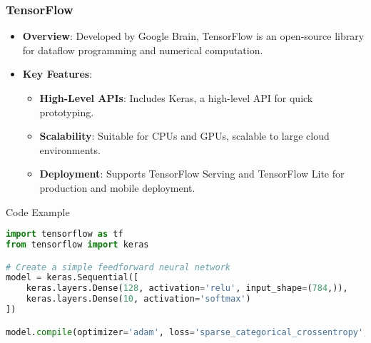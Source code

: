 \documentclass[aspectratio=169]{beamer}
\begin{document}
\begin{frame}[fragile]
    \frametitle{TensorFlow}
    \begin{itemize}
        \item \textbf{Overview}: Developed by Google Brain, TensorFlow is an open-source library for dataflow programming and numerical computation.
        \item \textbf{Key Features}:
            \begin{itemize}
                \item \textbf{High-Level APIs}: Includes Keras, a high-level API for quick prototyping.
                \item \textbf{Scalability}: Suitable for CPUs and GPUs, scalable to large cloud environments.
                \item \textbf{Deployment}: Supports TensorFlow Serving and TensorFlow Lite for production and mobile deployment.
            \end{itemize}
    \end{itemize}
    \begin{block}{Code Example}
        \begin{lstlisting}[language=Python]
import tensorflow as tf
from tensorflow import keras

# Create a simple feedforward neural network
model = keras.Sequential([
    keras.layers.Dense(128, activation='relu', input_shape=(784,)),
    keras.layers.Dense(10, activation='softmax')
])

model.compile(optimizer='adam', loss='sparse_categorical_crossentropy', metrics=['accuracy'])
        \end{lstlisting}
    \end{block}
\end{frame}
\end{document}
